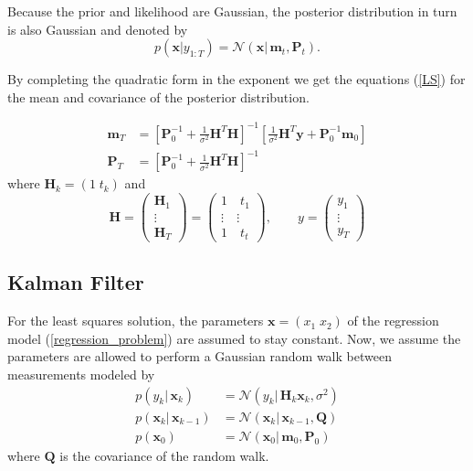 Because the prior and likelihood are Gaussian, the posterior distribution
in turn is also Gaussian and denoted by
$$ p(\mathbf{x} | y_{1:T}) = \mathcal{N}(\mathbf{x} | \,
\mathbf{m}_t, \mathbf{P}_t). $$

By completing the quadratic form in the exponent
we get the equations (\ref{LS}) for the mean and covariance
of the posterior distribution.

\begin{equation}
  \label{LS}
  \begin{aligned}
    \mathbf{m}_T &= \left[ \mathbf{P}^{-1}_0 + \frac{1}{\sigma^2} \mathbf{H}^T \mathbf{H}
                   \right]^{-1} \left[\frac{1}{\sigma^2} \mathbf{H}^T \mathbf{y} +
                   \mathbf{P}^{-1}_0 \mathbf{m}_0 \right] \\
    \mathbf{P}_T &= \left[\mathbf{P}_0^{-1} + \frac{1}{\sigma^2} \mathbf{H}^T \mathbf{H}
                 \right]^{-1}
  \end{aligned}
\end{equation}
where $\mathbf{H}_k = (1 \;t_k)$ and
$$ \mathbf{H} =
\begin{pmatrix} \mathbf{H}_1 \\ \vdots \\ \mathbf{H}_T \end{pmatrix}
= \begin{pmatrix}
  1 \quad t_1 \\
  \vdots \quad \vdots \\
  1 \quad t_t
\end{pmatrix},
\quad \quad y = \begin{pmatrix} y_1 \\ \vdots \\ y_T \end{pmatrix}
$$


\subsection{Kalman Filter} \label{KF}
For the least squares solution, the parameters
$\mathbf{x} = (x_{1} \; x_{2})$ of
the regression model (\ref{regression_problem}) are assumed to stay constant.
Now, we assume the parameters are allowed to perform
a Gaussian random walk between measurements modeled by
\begin{align*}
  p(y_k | \, \mathbf{x}_k) &= \mathcal{N}(y_k | \, \mathbf{H}_k \mathbf{x}_k, \sigma^2) \\
  p(\mathbf{x}_k | \, \mathbf{x}_{k-1}) &= \mathcal{N}(\mathbf{x}_k | \,
                               \mathbf{x}_{k-1}, \mathbf{Q}) \\
  p(\mathbf{x}_0) &= \mathcal{N}(\mathbf{x}_0 | \, \mathbf{m}_0, \mathbf{P}_0)
\end{align*}
where $\mathbf{Q}$ is the covariance of the random walk.

